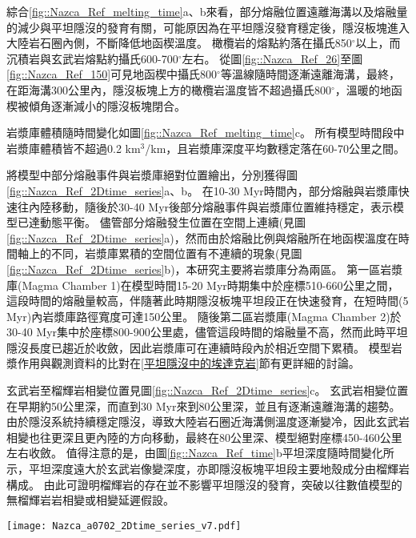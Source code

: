 綜合\ref{fig::Nazca_Ref_melting_time}a、b來看，部分熔融位置遠離海溝以及熔融量的減少與平坦隱沒的發育有關，可能原因為在平坦隱沒發育穩定後，隱沒板塊進入大陸岩石圈內側，不斷降低地函楔溫度。
橄欖岩的熔點約落在攝氏850$^{\circ}$以上，而沉積岩與玄武岩熔點約攝氏600-700$^{\circ}$左右。
從圖\ref{fig::Nazca_Ref_26}至圖\ref{fig::Nazca_Ref_150}可見地函楔中攝氏800$^{\circ}$等溫線隨時間逐漸遠離海溝，最終，在距海溝300公里內，隱沒板塊上方的橄欖岩溫度皆不超過攝氏800$^{\circ}$，溫暖的地函楔被傾角逐漸減小的隱沒板塊閉合。

岩漿庫體積隨時間變化如圖\ref{fig::Nazca_Ref_melting_time}c。
所有模型時間段中岩漿庫體積皆不超過0.2 km$^3$/km，且岩漿庫深度平均數穩定落在60-70公里之間。

將模型中部分熔融事件與岩漿庫絕對位置繪出，分別獲得圖\ref{fig::Nazca_Ref_2Dtime_series}a、b。
在10-30 Myr時間內，部分熔融與岩漿庫快速往內陸移動，隨後於30-40 Myr後部分熔融事件與岩漿庫位置維持穩定，表示模型已達動態平衡。
儘管部分熔融發生位置在空間上連續(見圖\ref{fig::Nazca_Ref_2Dtime_series}a)，然而由於熔融比例與熔融所在地函楔溫度在時間軸上的不同，岩漿庫累積的空間位置有不連續的現象(見圖\ref{fig::Nazca_Ref_2Dtime_series}b)，本研究主要將岩漿庫分為兩區。
第一區岩漿庫(Magma Chamber 1)在模型時間15-20 Myr時期集中於座標510-660公里之間，這段時間的熔融量較高，伴隨著此時期隱沒板塊平坦段正在快速發育，在短時間(5 Myr)內岩漿庫路徑寬度可達150公里。
隨後第二區岩漿庫(Magma Chamber 2)於30-40 Myr集中於座標800-900公里處，儘管這段時間的熔融量不高，然而此時平坦隱沒長度已趨近於收斂，因此岩漿庫可在連續時段內於相近空間下累積。
模型岩漿作用與觀測資料的比對在\ref{平坦隱沒中的埃達克岩}節有更詳細的討論。

玄武岩至榴輝岩相變位置見圖\ref{fig::Nazca_Ref_2Dtime_series}c。
玄武岩相變位置在早期約50公里深，而直到30 Myr來到80公里深，並且有逐漸遠離海溝的趨勢。
由於隱沒系統持續穩定隱沒，導致大陸岩石圈近海溝側溫度逐漸變冷，因此玄武岩相變也往更深且更內陸的方向移動，最終在80公里深、模型絕對座標450-460公里左右收斂。
值得注意的是，由圖\ref{fig::Nazca_Ref_time}b平坦深度隨時間變化所示，平坦深度遠大於玄武岩像變深度，亦即隱沒板塊平坦段主要地殼成分由榴輝岩構成。
由此可證明榴輝岩的存在並不影響平坦隱沒的發育，突破以往數值模型的無榴輝岩岩相變或相變延遲假設。
\begin{figure*}[h]
    \centering
    \texttt{[image: Nazca\_a0702\_2Dtime\_series\_v7.pdf]}
    \caption[智利參考模型部分熔融、岩漿庫與玄武岩相變時空關係圖]{智利參考模型部分熔融、岩漿庫與玄武岩相變位置時空關係圖。(a)圓點為智利參考模型於時間軸上部分熔融發生網格位置，圓點顏色代表時間，僅包含網格中熔融比例大於千分之一的網格。線條為每10 Myr的隱沒板塊頂部介面，分別為10 Myr、20 Myr、30 Myr與40 Myr，橫軸上方標示出模型於40 Myr的相對海溝距離。(b)圓點為智利參考模型於時間軸上岩漿庫網格位置，圓點顏色代表時間，僅繪出網格中岩漿比例大於萬分之一的網格。線條為每10 Myr的隱沒板塊頂部介面，分別為10 Myr、20 Myr、30 Myr與40 Myr，橫軸上方標示出模型於40 Myr的相對海溝距離。藍細線標示出兩個岩漿庫集中區寬度範圍，並分別在橘色方框中標出文中說明的岩漿庫區名稱。(c)圓點為智利參考模型於時間軸上之玄武岩相變位置變化圖，圓點顏色代表時間。}
    \label{fig::Nazca_Ref_2Dtime_series}
\end{figure*}

